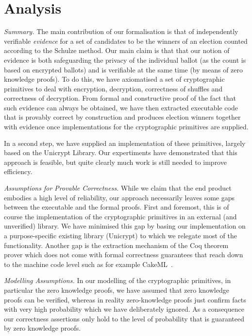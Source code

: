 \documentclass{llncs}
\begin{document}
\section{Analysis}

\noindent\emph{Summary.} The main contribution of our formalisation is that of independently
verifiable \emph{evidence} for a set of candidates to be the winners
of an election counted according to the Schulze method. Our main
claim is that that our notion of evidence is both safeguarding the
privacy of the individual ballot (as the count is based on encrypted
ballots) and is verifiable at the same time (by means of zero
knowledge proofs). To do this, we have axiomatised a set of
cryptographic primitives to deal with encryption, decryption,
correctness of shuffles and correctness of decryption. From formal
and constructive proof of the fact that such evidence can always be
obtained, we have then extracted executable code that is provably
correct by construction and produces election winners together with
evidence once implementations for the cryptographic primitives are
supplied.

In a second step, we have supplied an implementation of these
primitives, largely based on the Unicrypt Library. Our expertiments
have demonstrated that this approach is feasible, but quite clearly
much work is still needed to improve efficiency. 

\smallskip\noindent\emph{Assumptions for Provable Correctness.}
While we claim that the end product embodies a high level of
reliability, our approach necessarily leaves some gaps between the
executable and the formal proofs. First and foremost, this is of
course the implementation of the cryptographic primitives in an
external (and unverified) library. We have minimised this gap by
basing our implementation on a purpose-specific existing library
(Unicrypt) to which we relegate most of the functionality. Another
gap is the extraction mechanism of the Coq theorem prover which does
not come with formal correctness guarantees that reach down to the
machine code level such as for example CakeML~\cite{Kumar:2014:CVI}.

\smallskip\noindent\emph{Modelling Assumptions.} In our modelling of
the cryptographic primitives, in particular the zero knowledge
proofs, we have assumed that zero knowledge proofs can be verified,
whereas in reality zero-knowledge proofs just confirm facts with
very high probability which we have deliberately  ignored. As a
consequence our correctness assertions only hold to the level
of probability that is guaranteed by zero knowledge proofs.
\end{document}
